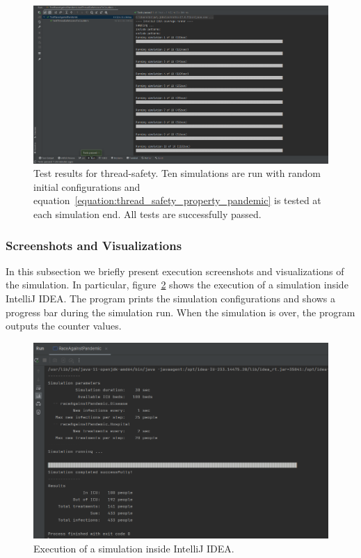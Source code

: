 \documentclass[acmlarge]{acmart}
\begin{document}
\begin{figure}[tb]
  \centering
  \includegraphics[width=0.75\linewidth]{figures/thread safety testing.png}
  \caption{Test results for thread-safety. Ten simulations are run with random initial configurations and equation~\ref{equation:thread_safety_property_pandemic} is tested at each simulation end. All tests are successfully passed.}
  \label{img:thread_safety_tests}
\end{figure}

\subsubsection{Screenshots and Visualizations}
In this subsection we briefly present execution screenshots and visualizations of the simulation. In particular, figure~\ref{img:disease_hospital_execution} shows the execution of a simulation inside IntelliJ IDEA. The program prints the simulation configurations and shows a progress bar during the simulation run. When the simulation is over, the program outputs the counter values.

\begin{figure}[h]
  \centering
  \includegraphics[width=0.75\linewidth]{figures/disease-hospital-execution.png}
  \caption{Execution of a simulation inside IntelliJ IDEA.}
  \label{img:disease_hospital_execution}
\end{figure}
\end{document}
